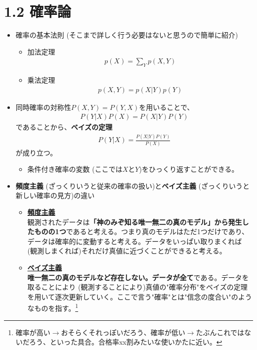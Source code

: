 \documentclass[a4j,11pt]{jarticle}
\begin{document}
\section*{1.2 確率論}
\begin{itemize}
	\item 確率の基本法則 (そこまで詳しく行う必要はないと思うので簡単に紹介)
		\begin{itemize}
			\item 加法定理
				\begin{align}
					p(X) = \sum_{Y}p(X,Y)
				\end{align}
			\item 乗法定理
				\begin{align}
					p(X,Y) = p(X|Y)p(Y)
				\end{align}
		\end{itemize}
	\item 同時確率の対称性$P(X,Y)=P(Y,X)$を用いることで、
		\begin{align}
			P(Y|X)P(X) = P(X|Y)P(Y)
		\end{align}
		であることから、\textbf{ベイズの定理}
		\begin{align}
			P(Y|X) = \frac{P(X|Y)P(Y)}{P(X)}
		\end{align}
		が成り立つ。
		\begin{itemize}
			\item 条件付き確率の変数 (ここでは$X$と$Y$)をひっくり返すことができる。
		\end{itemize}
	\item \textbf{頻度主義} (ざっくりいうと従来の確率の扱い)と\textbf{ベイズ主義} (ざっくりいうと新しい確率の見方)の違い
		\begin{itemize}
			\item \textbf{\underline{頻度主義}}\\
				観測されたデータは\textbf{「神のみぞ知る唯一無二の真のモデル」から発生したものの1つ}であると考える。つまり真のモデルはただ1つだけであり、データは確率的に変動すると考える。データをいっぱい取りまくれば (観測しまくれば)それだけ真値に近づくことができると考える。
			\item \textbf{\underline{ベイズ主義}}\\
				\textbf{唯一無二の真のモデルなど存在しない。データが全て}である。データを取ることにより (観測することにより)真値の"確率分布"をベイズの定理を用いて逐次更新していく。ここで言う"確率"とは"信念の度合い"のようなものを指す。\footnote{確率が高い$\to$おそらくそれっぽいだろう、確率が低い$\to$たぶんこれではないだろう、といった具合。合格率xx割みたいな使いかたに近い。}

\end{itemize}
\end{itemize}
\end{document}
